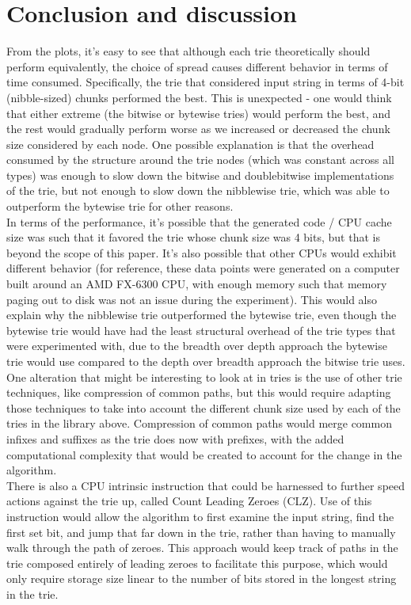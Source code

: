 \documentclass{llncs}
\begin{document}
\section{Conclusion and discussion}
From the plots, it's easy to see that although each trie theoretically should perform equivalently, the choice of spread causes different behavior in terms of time consumed. Specifically, the trie that considered input string in terms of 4-bit (nibble-sized) chunks performed the best. This is unexpected - one would think that either extreme (the bitwise or bytewise tries) would perform the best, and the rest would gradually perform worse as we increased or decreased the chunk size considered by each node. One possible explanation is that the overhead consumed by the structure around the trie nodes (which was constant across all types) was enough to slow down the bitwise and doublebitwise implementations of the trie, but not enough to slow down the nibblewise trie, which was able to outperform the bytewise trie for other reasons.\\
In terms of the performance, it's possible that the generated code / CPU cache size was such that it favored the trie whose chunk size was 4 bits, but that is beyond the scope of this paper. It's also possible that other CPUs would exhibit different behavior (for reference, these data points were generated on a computer built around an AMD FX-6300 CPU, with enough memory such that memory paging out to disk was not an issue during the experiment). This would also explain why the nibblewise trie outperformed the bytewise trie, even though the bytewise trie would have had the least structural overhead of the trie types that were experimented with, due to the breadth over depth approach the bytewise trie would use compared to the depth over breadth approach the bitwise trie uses.\\
One alteration that might be interesting to look at in tries is the use of other trie techniques, like compression of common paths, but this would require adapting those techniques to take into account the different chunk size used by each of the tries in the library above. Compression of common paths would merge common infixes and suffixes as the trie does now with prefixes, with the added computational complexity that would be created to account for the change in the algorithm.\\
There is also a CPU intrinsic instruction that could be harnessed to further speed actions against the trie up, called Count Leading Zeroes (CLZ). Use of this instruction would allow the algorithm to first examine the input string, find the first set bit, and jump that far down in the trie, rather than having to manually walk through the path of zeroes. This approach would keep track of paths in the trie composed entirely of leading zeroes to facilitate this purpose, which would only require storage size linear to the number of bits stored in the longest string in the trie. \\
\newpage
\end{document}

